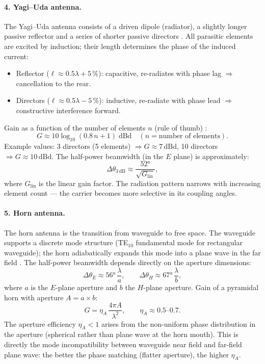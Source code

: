\paragraph{4. Yagi--Uda antenna.}

The Yagi--Uda antenna consists of a driven dipole (radiator), a slightly
longer passive reflector and a series of shorter passive directors
\cite{Yagi1928,Balanis2016}. All parasitic elements are excited by induction;
their length determines the phase of the induced current:
\begin{itemize}[nosep]
  \item Reflector ($\ell \approx 0.5\lambda + 5\,\%$): capacitive,
    re-radiates with phase lag $\Rightarrow$ cancellation to the rear.
  \item Directors ($\ell \approx 0.5\lambda - 5\,\%$): inductive,
    re-radiate with phase lead $\Rightarrow$ constructive interference
    forward.
\end{itemize}
Gain as a function of the number of elements $n$ (rule of thumb) \EM:
\[
  G \approx 10\log_{10}(0.8\,n + 1)\;\mathrm{dBd}
  \quad (n = \text{number of elements}).
\]
Example values: 3 directors (5 elements) $\Rightarrow G \approx 7\,\mathrm{dBd}$,
10 directors $\Rightarrow G \approx 10\,\mathrm{dBd}$.
The half-power beamwidth (in the $E$ plane) is approximately:
\[
  \Delta\theta_{3\,\mathrm{dB}} \approx \frac{52°}{\sqrt{G_\mathrm{lin}}},
\]
where $G_\mathrm{lin}$ is the linear gain factor. The radiation pattern
narrows with increasing element count --- the carrier becomes more selective
in its coupling angles.

\paragraph{5. Horn antenna.}

The horn antenna is the transition from waveguide to free space. The
waveguide supports a discrete mode structure (TE$_{10}$ fundamental mode
for rectangular waveguide); the horn adiabatically expands this mode into
a plane wave in the far field \cite{Balanis2016,Pozar2012}. The half-power
beamwidth depends directly on the aperture dimensions:
\[
  \Delta\theta_{E} \approx 56°\,\frac{\lambda}{a}, \qquad
  \Delta\theta_{H} \approx 67°\,\frac{\lambda}{b},
\]
where $a$ is the $E$-plane aperture and $b$ the $H$-plane aperture.
Gain of a pyramidal horn with aperture $A = a \times b$:
\[
  G = \eta_A\,\frac{4\pi A}{\lambda^2}, \qquad \eta_A \approx 0.5\text{--}0.7.
\]
The aperture efficiency $\eta_A < 1$ arises from the non-uniform phase
distribution in the aperture (spherical rather than plane wave at the
horn mouth). This is directly the mode incompatibility between waveguide
near field and far-field plane wave: the better the phase matching (flatter
aperture), the higher $\eta_A$.

